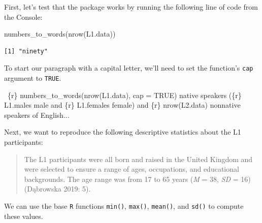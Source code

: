\documentclass[
  letterpaper,
  DIV=11,
  numbers=noendperiod]{scrreprt}
\newenvironment{Shaded}{\begin{snugshade}}{\end{snugshade}}
\newcommand{\FunctionTok}[1]{\textcolor[rgb]{0.28,0.35,0.67}{#1}}
\newcommand{\InformationTok}[1]{\textcolor[rgb]{0.37,0.37,0.37}{#1}}
\newcommand{\NormalTok}[1]{\textcolor[rgb]{0.00,0.23,0.31}{#1}}
\begin{document}
First, let's test that the package works by running the following line
of code from the Console:

\begin{Shaded}
\begin{Highlighting}[]
\FunctionTok{numbers\_to\_words}\NormalTok{(}\FunctionTok{nrow}\NormalTok{(L1.data))}
\end{Highlighting}
\end{Shaded}

\begin{verbatim}
[1] "ninety"
\end{verbatim}

To start our paragraph with a capital letter, we'll need to set the
function's \texttt{cap} argument to \texttt{TRUE}.

\begin{Shaded}
\begin{Highlighting}[]
 \InformationTok{\textasciigrave{}\{r\} numbers\_to\_words(nrow(L1.data), cap = TRUE)\textasciigrave{}}\NormalTok{ native speakers (}\InformationTok{\textasciigrave{}\{r\} L1.males\textasciigrave{}}\NormalTok{ male and }\InformationTok{\textasciigrave{}\{r\} L1.females\textasciigrave{}}\NormalTok{ female) and }\InformationTok{\textasciigrave{}\{r\} nrow(L2.data)\textasciigrave{}}\NormalTok{ nonnative speakers of English...}
\end{Highlighting}
\end{Shaded}

Next, we want to reproduce the following descriptive statistics about
the L1 participants:

\begin{quote}
The L1 participants were all born and raised in the United Kingdom and
were selected to ensure a range of ages, occupations, and educational
backgrounds. The age range was from 17 to 65 years (\emph{M} = 38,
\emph{SD} = 16) (Dąbrowska 2019: 5).
\end{quote}

We can use the base \texttt{R} functions \texttt{min()}, \texttt{max()},
\texttt{mean()}, and \texttt{sd()} to compute these values.

\begin{Shaded}
\end{Shaded}
\end{document}
